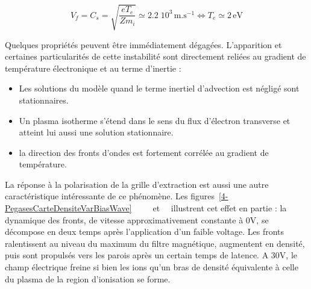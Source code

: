 \begin{refsection}
 \begin{equation}
 	V_f=C_{s}=\sqrt{\frac{eT_e}{Zm_i}}\simeq 2.2\;10^{3}\,\text{m.s}^{-1}
 	\Leftrightarrow T_e\simeq 2\,\text{eV}
 \end{equation}
 
 Quelques propriétés peuvent être immédiatement dégagées. L'apparition et
 certaines particularités de cette instabilité sont directement reliées au
 gradient de température électronique et au terme d'inertie  :
 
 \begin{itemize}
   	\item Les solutions du modèle quand le terme inertiel d'advection est
	négligé sont stationnaires.
   \item Un plasma isotherme s'étend dans le sens du flux d'électron
   transverse et atteint lui aussi une solution stationnaire.
   \item la direction des fronts d'ondes est fortement corrélée au gradient
   de température.
\end{itemize}

La réponse à la polarisation de la grille d'extraction est aussi une autre
caractéristique intéressante de ce phénomène. Les
figures~\ref{4-PegasesCarteDensiteVarBiasWave}~
~ ~
et~~ illustrent cet effet en partie : la
dynamique des fronts, de vitesse approximativement constante à 0V, se décompose
en deux temps après l'application d'un faible voltage. Les fronts ralentissent
au niveau du maximum du filtre magnétique, augmentent en densité, puis sont
propulsés vers les parois après un certain temps de latence. A 30V, le champ
électrique freine si bien les ions qu'un bras de densité équivalente à celle du
plasma de la region d'ionisation se forme. 
	

\end{refsection}
